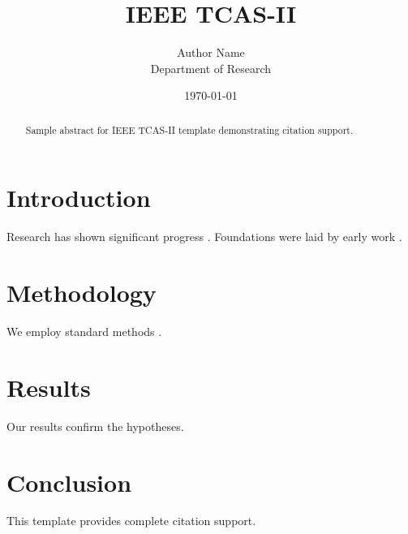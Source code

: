 ﻿\documentclass{IEEEtran}
\title{IEEE TCAS-II}
\author{Author Name \\ \small Department of Research}
\date{\today}
\begin{document}
\maketitle

\begin{abstract}
Sample abstract for IEEE TCAS-II template demonstrating citation support.
\end{abstract}

\section{Introduction}
Research has shown significant progress \citep{einstein1905}. Foundations were laid by early work \citep{turing1950}.

\section{Methodology}
We employ standard methods \citep{knuth1984}.

\section{Results}
Our results confirm the hypotheses.

\section{Conclusion}
This template provides complete citation support.



\end{document}

